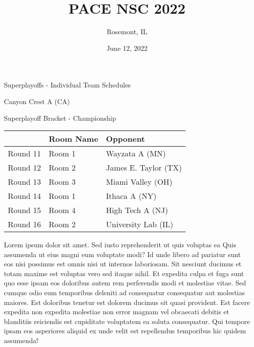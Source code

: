\documentclass{article}%
\title{PACE NSC 2022}%
\author{Rosemont, IL}%
\date{June 12, 2022}%
\begin{document}
%
\normalsize%
%
\maketitle%
\vspace*{48pt}%
\begin{center}%
\begin{Huge}%
Superplayoffs {-} Individual Team Schedules%
\end{Huge}%
\end{center}%
\newpage%
\pagestyle{fancy}%
\fancyhf{}%
%
%
%
\begin{center}%
\begin{Huge}%
Canyon Crest A (CA)%
\end{Huge}%
\vspace*{8pt}%
\linebreak%
\begin{Large}%
Superplayoff Bracket {-} Championship%
\end{Large}%
\end{center}%
%
\begin{tabularx}{\textwidth}{|c|Y|Y|}%
\hline%
&Room Name&Opponent\\%
\hline%
Round 11&Room 1&Wayzata A (MN)\\%
Round 12&Room 2&James E. Taylor (TX)\\%
Round 13&Room 3&Miami Valley (OH)\\%
Round 14&Room 1&Ithaca A (NY)\\%
Round 15&Room 4&High Tech A (NJ)\\%
Round 16&Room 2&University Lab (IL)\\%
\hline%
\end{tabularx}%
\vspace*{8pt}%
\linebreak%
\newline%
\newline%
    Lorem ipsum dolor sit amet. Sed iusto reprehenderit ut quis voluptas ea Quis assumenda ut eius magni eum voluptate modi? Id unde libero ad pariatur sunt eos nisi possimus est omnis nisi ut internos laboriosam. Sit nesciunt ducimus et totam maxime est voluptas vero sed itaque nihil. Et expedita culpa et fuga sunt quo esse ipsam eos doloribus autem rem perferendis modi et molestiae vitae.\newline%
\newline%
    Sed cumque odio eum temporibus deleniti ad consequatur consequatur aut molestias maiores. Est doloribus tenetur est dolorem ducimus sit quasi provident. Est facere expedita non expedita molestiae non error magnam vel obcaecati debitis et blanditiis reiciendis est cupiditate voluptatem ea soluta consequatur. Qui tempore ipsam eos asperiores aliquid ex unde velit est repellendus temporibus hic quidem assumenda!\newline%
\end{document}

